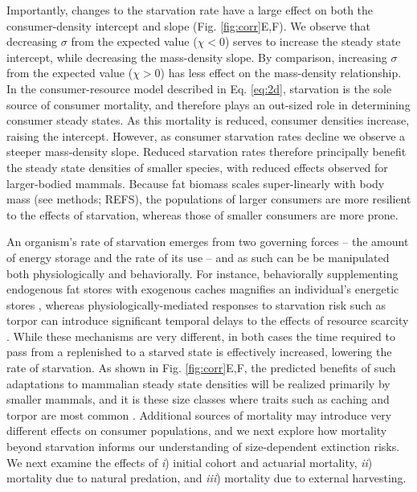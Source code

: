 \documentclass[11pt]{article}
\begin{document}
Importantly, changes to the starvation rate have a large effect on both the consumer-density intercept and slope (Fig. \ref{fig:corr}E,F).
We observe that decreasing $\sigma$ from the expected value ($\chi<0$) serves to increase the steady state intercept, while decreasing the mass-density slope.
By comparison, increasing $\sigma$ from the expected value ($\chi>0$) has less effect on the mass-density relationship.
In the consumer-resource model described in Eq. \ref{eq:2d}, starvation is the sole source of consumer mortality, and therefore plays an out-sized role in determining consumer steady states. 
As this mortality is reduced, consumer densities increase, raising the intercept.
However, as consumer starvation rates decline we observe a steeper mass-density slope.
Reduced starvation rates therefore principally benefit the steady state densities of smaller species, with reduced effects observed for larger-bodied mammals.
Because fat biomass scales super-linearly with body mass (see methods; REFS), the populations of larger consumers are more resilient to the effects of starvation, whereas those of smaller consumers are more prone.

An organism's rate of starvation emerges from two governing forces -- the amount of energy storage and the rate of its use -- and as such can be be manipulated both physiologically and behaviorally.
For instance, behaviorally supplementing endogenous fat stores with exogenous caches magnifies an individual's energetic stores \citep{yeakel2020caching}, whereas physiologically-mediated responses to starvation risk such as torpor can introduce significant temporal delays to the effects of resource scarcity \citep{schubert2010daily}.
While these mechanisms are very different, in both cases the time required to pass from a replenished to a starved state is effectively increased, lowering the rate of starvation.
As shown in Fig. \ref{fig:corr}E,F, the predicted benefits of such adaptations to mammalian steady state densities will be realized primarily by smaller mammals, and it is these size classes where traits such as caching and torpor are most common \citep{geiser1998evolution,smith1984evolution,yeakel2020caching}. 
Additional sources of mortality may introduce very different effects on consumer populations, and we next explore how mortality beyond starvation informs our understanding of size-dependent extinction risks.
We next examine the effects of \emph{i}) initial cohort and actuarial mortality, \emph{ii}) mortality due to natural predation, and \emph{iii}) mortality due to external harvesting.
\end{document}
